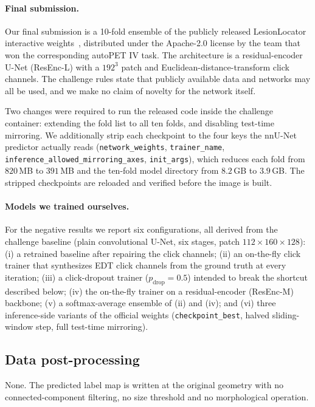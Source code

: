 \documentclass[runningheads]{llncs}
\begin{document}
\paragraph{Final submission.}
Our final submission is a 10-fold ensemble of the publicly released
LesionLocator interactive weights~\cite{lesionlocator}, distributed under the
Apache-2.0 license by the team that won the corresponding autoPET IV task. The
architecture is a residual-encoder U-Net (ResEnc-L) with a $192^3$ patch and
Euclidean-distance-transform click channels. The challenge rules state that
publicly available data and networks may all be used, and we make no claim of
novelty for the network itself.

Two changes were required to run the released code inside the challenge
container: extending the fold list to all ten folds, and disabling test-time
mirroring. We additionally strip each checkpoint to the four keys the nnU-Net
predictor actually reads (\texttt{network\_weights}, \texttt{trainer\_name},
\texttt{inference\_allowed\_mirroring\_axes}, \texttt{init\_args}), which
reduces each fold from $820$\,MB to $391$\,MB and the ten-fold model directory
from $8.2$\,GB to $3.9$\,GB. The stripped checkpoints are reloaded and verified
before the image is built.

\paragraph{Models we trained ourselves.}
For the negative results we report six configurations, all derived from the
challenge baseline (plain convolutional U-Net, six stages, patch
$112\times160\times128$):
(i) a retrained baseline after repairing the click channels;
(ii) an on-the-fly click trainer that synthesizes EDT click channels from the
ground truth at every iteration;
(iii) a click-dropout trainer ($p_{\mathrm{drop}}=0.5$) intended to break the
shortcut described below;
(iv) the on-the-fly trainer on a residual-encoder (ResEnc-M) backbone;
(v) a softmax-average ensemble of (ii) and (iv);
and (vi) three inference-side variants of the official weights
(\texttt{checkpoint\_best}, halved sliding-window step, full test-time
mirroring).

\subsection{Data post-processing}

None. The predicted label map is written at the original geometry with no
connected-component filtering, no size threshold and no morphological
operation.
\end{document}
